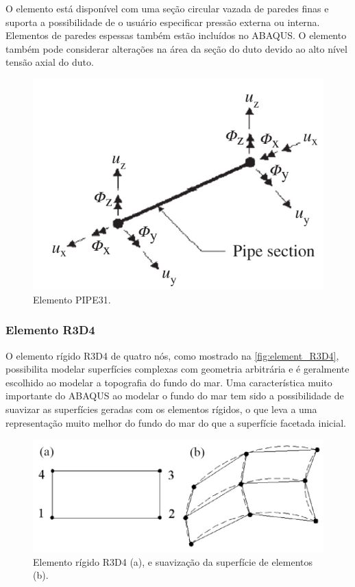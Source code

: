 O elemento está disponível com uma seção circular vazada de paredes finas e suporta a possibilidade de o usuário especificar pressão externa ou interna.
Elementos de paredes espessas também estão incluídos no ABAQUS.
O elemento também pode considerar alterações na área da seção do duto devido ao alto nível tensão axial do duto.

\begin{figure}[!ht]
    \centering
    \caption{Elemento PIPE31.}\label{fig:elemen_PIPE31H}
    \includegraphics[width=0.5\linewidth]{imagens/elemen_PIPE31H}
\end{figure}

\subsubsection{Elemento R3D4}

O elemento rígido R3D4 de quatro nós, como mostrado na \autoref{fig:element_R3D4}, possibilita modelar superfícies complexas com geometria arbitrária e é geralmente escolhido ao modelar a topografia do fundo do mar. Uma característica muito importante do ABAQUS ao modelar o fundo do mar tem sido a possibilidade de suavizar as superfícies geradas com os elementos rígidos, o que leva a uma representação muito melhor do fundo do mar do que a superfície facetada inicial.

\begin{figure}[!ht]
    \centering
    \caption{Elemento rígido R3D4 (a), e suavização da superfície de elementos (b).}\label{fig:element_R3D4}
    \includegraphics[width=0.7\linewidth]{imagens/element_R3D4}
\end{figure}

